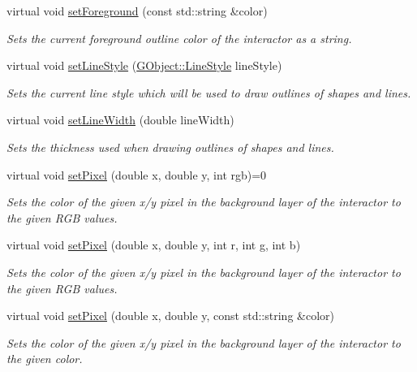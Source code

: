 \begin{DoxyCompactItemize}
virtual void \mbox{\hyperlink{classGDrawingSurface_af59209aeadea6dfc6d97a2d8531f50e1}{set\+Foreground}} (const std\+::string \&color)
\begin{DoxyCompactList}\small\item\em Sets the current foreground outline color of the interactor as a string. \end{DoxyCompactList}\item 
virtual void \mbox{\hyperlink{classGDrawingSurface_a6bfe14a77101db0fb97b5a7e07a5526b}{set\+Line\+Style}} (\mbox{\hyperlink{classGObject_a86e0f5648542856159bb40775c854aa7}{G\+Object\+::\+Line\+Style}} line\+Style)
\begin{DoxyCompactList}\small\item\em Sets the current line style which will be used to draw outlines of shapes and lines. \end{DoxyCompactList}\item 
virtual void \mbox{\hyperlink{classGDrawingSurface_afd6a47c6ea6a1f85ca05a65ba3ff3477}{set\+Line\+Width}} (double line\+Width)
\begin{DoxyCompactList}\small\item\em Sets the thickness used when drawing outlines of shapes and lines. \end{DoxyCompactList}\item 
virtual void \mbox{\hyperlink{classGDrawingSurface_ac9f0a75ccb0abe1123046bab56479b84}{set\+Pixel}} (double x, double y, int rgb)=0
\begin{DoxyCompactList}\small\item\em Sets the color of the given x/y pixel in the background layer of the interactor to the given R\+GB values. \end{DoxyCompactList}\item 
virtual void \mbox{\hyperlink{classGDrawingSurface_aec90e927c9da286214908d3f9da685d7}{set\+Pixel}} (double x, double y, int r, int g, int b)
\begin{DoxyCompactList}\small\item\em Sets the color of the given x/y pixel in the background layer of the interactor to the given R\+GB values. \end{DoxyCompactList}\item 
virtual void \mbox{\hyperlink{classGDrawingSurface_a09f9640e4ff7388dcfc391efd88d2415}{set\+Pixel}} (double x, double y, const std\+::string \&color)
\begin{DoxyCompactList}\small\item\em Sets the color of the given x/y pixel in the background layer of the interactor to the given color. \end{DoxyCompactList}\item 

\end{DoxyCompactItemize}
